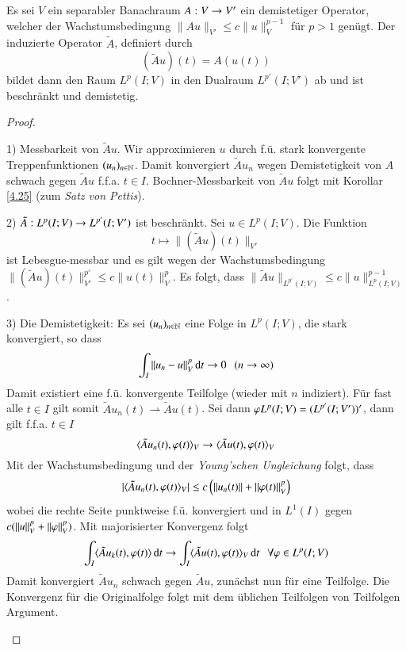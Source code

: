 \begin{lem}\label{4.40}
    Es sei $V$ ein separabler Banachraum $A:V\rightarrow V'$ ein demistetiger Operator, welcher der
    Wachstumsbedingung $\|Au\|_{V'}\leq c\|u\|_V^{p-1}$ für $p>1$ genügt. Der induzierte Operator
    $\tilde A$, definiert durch
    \[
        (\tilde Au)(t)=A(u(t))
    \]
    bildet dann den Raum $L^p(I;V)$ in den Dualraum  $L^{p'}(I;V')$ ab und ist beschränkt und demistetig.
\end{lem}

\begin{proof}
    \begin{description}
        \item{1)}
        Messbarkeit von $\tilde Au$. Wir approximieren $u$ durch  f.ü. stark konvergente
        Treppenfunktionen $(u_n)_{n\in\mathbb{N}}$. Damit konvergiert $\tilde Au_n$ wegen Demistetigkeit von
        $A$ schwach gegen $\tilde A u$ f.f.a. $t\in I$. Bochner-Messbarkeit von $\tilde Au$ folgt mit
        Korollar \ref{4.25} (zum \textit{Satz von Pettis}).
        \item{2)}
        $\tilde A: L^p(I;V)\rightarrow L^{p'}(I; V')$ ist beschränkt. Sei $u\in L^p(I;V)$. Die Funktion
        \[
            t\mapsto \|(\tilde A u )(t)\|_{V'}
        \]
        ist Lebesgue-messbar und es gilt wegen der Wachstumsbedingung $\|(\tilde Au)(t)\|_{V'}^{p'}
        \leq c \|u(t)\|_V^p$. Es folgt, dass $\|\tilde A u\|_{L^{p'}(I;V)}\leq c\|u\|^{p-1}_{L^p(I;V)}$.
        \item{3)}
        Die Demistetigkeit: Es sei $(u_n)_{n\in\mathbb{N}}$ eine Folge in $L^p(I;V)$, die stark konvergiert,
        so dass
        \[
            \int_I\|u_n - u\|_V^p \, \mathrm{d} t \rightarrow 0 \hspace{.25cm} (n\rightarrow \infty)
        \]
        Damit existiert eine f.ü. konvergente Teilfolge (wieder mit $n$ indiziert). Für fast alle
        $t\in I$ gilt somit $\tilde Au_n(t)\rightharpoonup \tilde Au(t)$. Sei dann $\varphi L^p(I;V)
        =(L^{p'}(I;V'))'$, dann gilt f.f.a. $t\in I$
        \[
            \langle \tilde A u_n (t),\varphi (t)\rangle_V \rightarrow \langle \tilde Au(t), \varphi (t)\rangle _V
        \]
        Mit der Wachstumsbedingung und der \textit{Young'schen Ungleichung} folgt, dass
        \[
            |\langle \tilde A u_n  (t), \varphi (t)\rangle _V|\leq c \left( \|u_n(t)\| + \|\varphi(t)\|_V^p\right)
        \]
        wobei die rechte Seite punktweise f.ü. konvergiert und in $L^1(I)$ gegen 
        $c(\|u\|_V^p+\|\varphi\|_V^p)$. Mit majorisierter Konvergenz folgt
        \[
            \int_I\langle \tilde Au_k(t),\varphi(t)\rangle \, \mathrm{d} t \rightarrow \int_I \langle \tilde A u (t), \varphi (t)\rangle _V \, \mathrm{d} t
            \hspace{.25cm} \forall \varphi \in L^p(I;V)
        \]
        Damit konvergiert $\tilde Au_n$ schwach gegen $\tilde Au$, zunächst nun für eine Teilfolge.
        Die Konvergenz für die Originalfolge folgt mit dem üblichen Teilfolgen von Teilfolgen Argument.
    \end{description}
    \[ \]
\end{proof}
